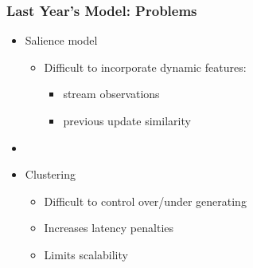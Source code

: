 \documentclass{beamer}
\begin{document}
\begin{frame}
    \frametitle{Last Year's Model: Problems} 

    \begin{itemize}
        \item Salience model
            \begin{itemize}
                \item Difficult to incorporate dynamic features:
                    \begin{itemize}
                        \item stream observations
                        \item previous update similarity
                    \end{itemize}
            \end{itemize}
        \item[] ~\\
        \item Clustering
            \begin{itemize}
                \item Difficult to control over/under generating
                \item Increases latency penalties
                \item Limits scalability
            \end{itemize}
    \end{itemize}

\end{frame}
\end{document}
